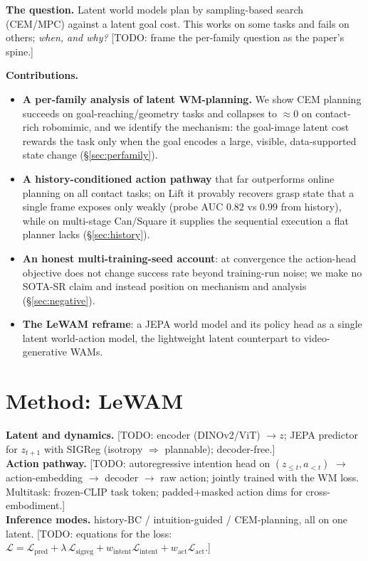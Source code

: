 \documentclass[11pt]{article}
\newcommand{\todo}[1]{{\color{red}[TODO: #1]}}
\begin{document}
\textbf{The question.} Latent world models plan by sampling-based search (CEM/MPC) against a latent goal cost. This works on some tasks and fails on others; \emph{when, and why?} \todo{frame the per-family question as the paper's spine.}

\textbf{Contributions.}
\begin{itemize}
  \item \textbf{A per-family analysis of latent WM-planning.} We show CEM planning succeeds on goal-reaching/geometry tasks and collapses to $\approx 0$ on contact-rich robomimic, and we identify the mechanism: the goal-image latent cost rewards the task only when the goal encodes a large, visible, data-supported state change (\S\ref{sec:perfamily}).
  \item \textbf{A history-conditioned action pathway} that far outperforms online planning on all contact tasks; on Lift it provably recovers grasp state that a single frame exposes only weakly (probe AUC $0.82$ vs $0.99$ from history), while on multi-stage Can/Square it supplies the sequential execution a flat planner lacks (\S\ref{sec:history}).
  \item \textbf{An honest multi-training-seed account}: at convergence the action-head objective does not change success rate beyond training-run noise; we make no SOTA-SR claim and instead position on mechanism and analysis (\S\ref{sec:negative}).
  \item \textbf{The LeWAM reframe}: a JEPA world model and its policy head as a single latent world-action model, the lightweight latent counterpart to video-generative WAMs.
\end{itemize}



\section{Method: LeWAM}\label{sec:method}
\textbf{Latent and dynamics.} \todo{encoder (DINOv2/ViT) $\to z$; JEPA predictor for $z_{t+1}$ with SIGReg (isotropy $\Rightarrow$ plannable); decoder-free.}\\
\textbf{Action pathway.} \todo{autoregressive intention head on $(z_{\le t}, a_{<t})$ $\to$ action-embedding $\to$ decoder $\to$ raw action; jointly trained with the WM loss. Multitask: frozen-CLIP task token; padded+masked action dims for cross-embodiment.}\\
\textbf{Inference modes.} history-BC / intuition-guided / CEM-planning, all on one latent. \todo{equations for the loss: $\mathcal{L}=\mathcal{L}_{\text{pred}}+\lambda\,\mathcal{L}_{\text{sigreg}}+w_{\text{intent}}\mathcal{L}_{\text{intent}}+w_{\text{act}}\mathcal{L}_{\text{act}}$.}
\end{document}
